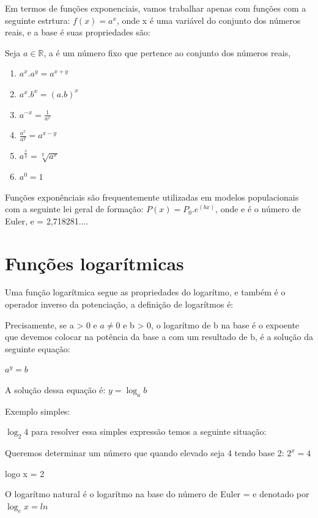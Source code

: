 \begin{multicols*}{2}
    Em termos de funções exponenciais, vamos trabalhar apenas com funções com a seguinte estrtura:
    $f(x) = a^x$, onde x é uma variável do conjunto dos números reais, e a base é suas propriedades 		são:

    Seja $a \in \mathbb{R}$, a é um número fixo que pertence ao conjunto dos números reais,
    \begin{enumerate}
        \item $a^{x}.a^{y} = a^{x+y}$
        \item $a^x.b^x = (a.b)^{x}$
        \item $a^{-x} = \frac{1}{a^x}$
        \item $\frac{a^x}{a^y} = a^{x - y}$
        \item $ a^{\frac{x}{y}}  = \sqrt[y]{a^x}$
        \item $a^0 = 1$
    \end{enumerate}

    Funções exponênciais são frequentemente utilizadas em modelos populacionais com a seguinte lei 			geral de formação: $P(x) = P_0 . e^{(bx)}$, onde e é o número de Euler, e = 2,718281....


    \section*{Funções logarítmicas}
    Uma função logarítmica segue as propriedades do logarítmo, e também é o operador inverso da 			potenciação, a definição de logarítmos é:

    \begin{theorem}
        Precisamente, se a > 0 e $a \ne 0$  e b > 0, o logarítmo de b na base é o expoente que 				devemos colocar na potência da base a com um resultado de b, é a solução da seguinte equação:

        $a^{y} = b$

        A solução dessa equação é: $y = \log_a b$

    \end{theorem}

    Exemplo simples:

    $\log_2 4 $ para resolver essa simples expressão temos a seguinte situação:

    Queremos determinar um número que quando elevado seja 4 tendo base 2: $2^x = 4$

    logo x = 2

    O logarítmo natural é o logarítmo na base do número de Euler = e denotado por $\log_e x = ln$


\end{multicols*}
